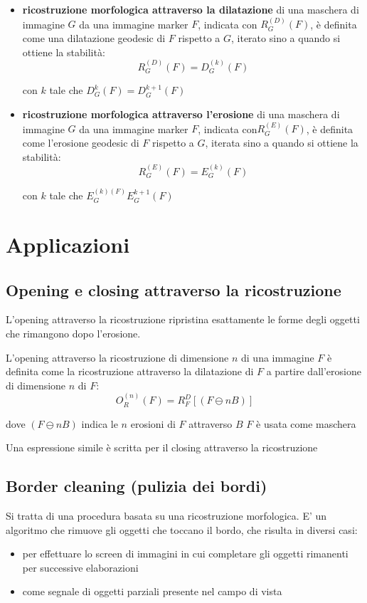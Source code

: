 \begin{itemize}
	\item \textbf{ricostruzione morfologica attraverso la dilatazione} di una maschera di immagine $G$ da una immagine marker $F$, indicata con $R_G^{(D)} (F)$, è definita come una dilatazione geodesic di $F$ rispetto a $G$, iterato sino a quando si ottiene la stabilità:
	$$
	R_G^{(D)} (F) = D_G^{(k)}(F)
	$$
	
	con $k$ tale che $D_G^k (F) = D_G^{k+1} (F)$
	
	\item \textbf{ricostruzione morfologica attraverso l'erosione} di una maschera di immagine $G$ da una immagine marker $F$, indicata con$R_G^{(E)} (F)$, è definita come l'erosione geodesic di $F$ rispetto a $G$, iterata sino a quando si ottiene la stabilità:
	$$
	R_G^(E) (F) = E_G^{(k)} (F)
	$$
	
	con $k$ tale che $E_G^{(k) (F)} E_G^{k+1} (F)$
\end{itemize}

\section{Applicazioni}

\subsection{Opening e closing attraverso la ricostruzione}
L'opening attraverso la ricostruzione ripristina esattamente le forme degli oggetti che rimangono dopo l'erosione.

L'opening attraverso la ricostruzione di dimensione $n$ di una immagine $F$ è definita come la ricostruzione attraverso la dilatazione di $F$ a partire dall'erosione di dimensione $n$ di $F$:
$$
O_R^{(n)} (F) = R_F^D[(F \ominus n B)]
$$

dove $(F \ominus n B)$ indica le $n$ erosioni di $F$ attraverso $B$
$F$ è usata come maschera

Una espressione simile è scritta per il closing attraverso la ricostruzione

\subsection{Border cleaning (pulizia dei bordi)}
Si tratta di una procedura basata su una ricostruzione morfologica.
E' un algoritmo che rimuove gli oggetti che toccano il bordo, che risulta in diversi casi:

\begin{itemize}
	\item per effettuare lo screen di immagini in cui completare gli oggetti rimanenti per successive elaborazioni
	
	\item come segnale di oggetti parziali presente nel campo di vista
\end{itemize}

